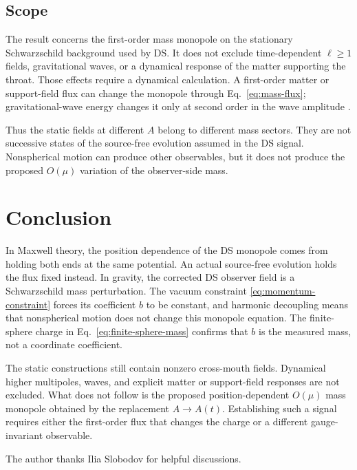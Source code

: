 \documentclass[aps,prd,10pt,onecolumn,nofootinbib,superscriptaddress,floatfix]{revtex4-2}
\begin{document}
\subsection{Scope}

The result concerns the first-order mass monopole on the stationary
Schwarzschild background used by DS.  It does not exclude time-dependent
$\ell\ge1$ fields, gravitational waves, or a dynamical response of the matter
supporting the throat.  Those effects require a dynamical calculation.  A
first-order matter or support-field flux can change the monopole through
Eq.~\eqref{eq:mass-flux}; gravitational-wave energy changes it only at second
order in the wave amplitude
\cite{BondiVanderBurgMetzner1962Gravitational,Sachs1962Asymptotic}.

Thus the static fields at different $A$ belong to different mass sectors.
They are not successive states of the source-free evolution assumed in the DS
signal.  Nonspherical motion can produce other observables, but it does not
produce the proposed $O(\mu)$ variation of the observer-side mass.

\section{Conclusion}
\label{sec:conclusion}

In Maxwell theory, the position dependence of the DS monopole comes from
holding both ends at the same potential.  An actual source-free evolution
holds the flux fixed instead.  In gravity, the corrected DS observer field is
a Schwarzschild mass perturbation.  The vacuum constraint
\eqref{eq:momentum-constraint} forces its coefficient $b$ to be constant, and
harmonic decoupling means that nonspherical motion does not change this
monopole equation.  The finite-sphere charge in
Eq.~\eqref{eq:finite-sphere-mass} confirms that $b$ is the measured mass, not a
coordinate coefficient.

The static constructions still contain nonzero cross-mouth fields.  Dynamical
higher multipoles, waves, and explicit matter or support-field responses are
not excluded.  What does not
follow is the proposed position-dependent $O(\mu)$ mass monopole obtained by
the replacement $A\to A(t)$.  Establishing such a signal requires either the
first-order flux that changes the charge or a different gauge-invariant
observable.

\begin{acknowledgments}
The author thanks Ilia Slobodov for helpful discussions.
\end{acknowledgments}
\end{document}
